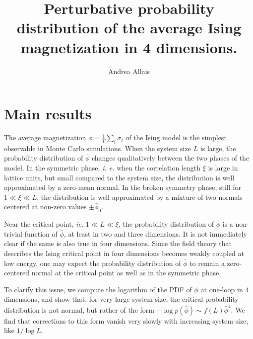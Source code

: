 \documentclass[11pt,a4paper]{article}
\title{Perturbative probability distribution of the average Ising magnetization
in 4 dimensions.}
\author[a]{Andrea Allais}
\affiliation[a]{Independent scholar}
\begin{document}
\maketitle

\section{Main results}

The average magnetization $\bar{\phi} = \frac{1}{V} \sum_{i} \sigma_i$ of the
Ising model is the simplest observable in Monte Carlo simulations. When the
system size $L$ is large, the probability distribution of $\bar{\phi}$ changes
qualitatively between the two phases of the model. In the symmetric phase,
\textit{i. e.} when the correlation length $\xi$ is large in lattice units, but
small compared to the system size, the distribution is well approximated by a
zero-mean normal. In the broken symmetry phase, still for $1 \ll \xi \ll L$,
the distribution is well approximated by a mixture of two normals centered at
non-zero values $\pm \bar{\phi}_0$.

Near the critical point, \textit{ie.} $1 \ll L \ll \xi$, the probability
distribution of $\bar{\phi}$ is a non-trivial function of $\bar{\phi}$, at
least in two and three dimensions.  It is not immediately clear if the same is
also true in four dimensions. Since the field theory that describes the Ising
critical point in four dimensions becomes weakly coupled at low energy, one may
expect the probability distribution of $\bar{\phi}$ to remain a zero-centered
normal at the critical point as well as in the symmetric phase.

To clarify this issue, we compute the logarithm of the PDF of $\bar{\phi}$ at
one-loop in $4$ dimensions, and show that, for very large system size, the
critical probability distribution is not normal, but rather of the form $-\log
p(\bar{\phi})\sim f(L) \bar{\phi}^4$. We find that corrections to this form
vanish very slowly with increasing system size, like $1/\log L$.
\end{document}
